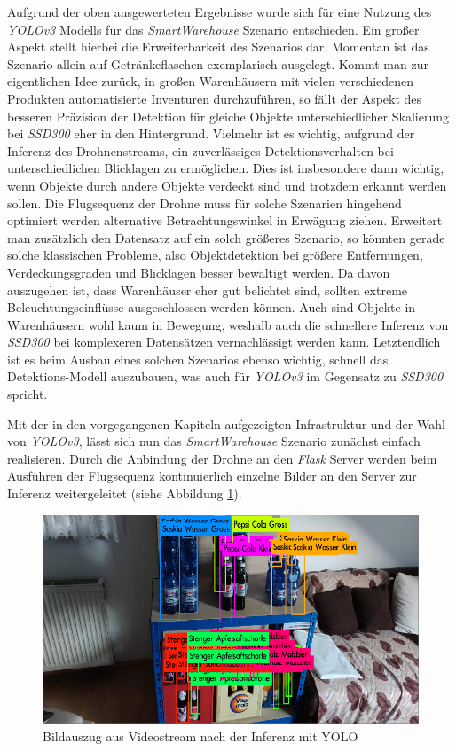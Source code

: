Aufgrund der oben ausgewerteten Ergebnisse wurde sich für eine Nutzung des \textit{YOLOv3} Modells für das \textit{SmartWarehouse} Szenario entschieden. Ein großer Aspekt stellt hierbei die Erweiterbarkeit des Szenarios dar. Momentan ist das Szenario allein auf Getränkeflaschen exemplarisch ausgelegt. Kommt man zur eigentlichen Idee zurück, in großen Warenhäusern mit vielen verschiedenen Produkten automatisierte Inventuren durchzuführen, so fällt der Aspekt des besseren Präzision der Detektion für gleiche Objekte unterschiedlicher Skalierung bei \textit{SSD300} eher in den Hintergrund. Vielmehr ist es wichtig, aufgrund der Inferenz des Drohnenstreams, ein zuverlässiges Detektionsverhalten bei unterschiedlichen Blicklagen zu ermöglichen. Dies ist insbesondere dann wichtig, wenn Objekte durch andere Objekte verdeckt sind und trotzdem erkannt werden sollen. Die Flugsequenz der Drohne muss für solche Szenarien hingehend optimiert werden alternative Betrachtungswinkel in Erwägung ziehen. Erweitert man zusätzlich den Datensatz auf ein solch größeres Szenario, so könnten gerade solche klassischen Probleme, also Objektdetektion bei größere Entfernungen, Verdeckungsgraden und Blicklagen besser bewältigt werden. Da davon auszugehen ist, dass Warenhäuser eher gut belichtet sind, sollten extreme Beleuchtungseinflüsse ausgeschlossen werden können. Auch sind Objekte in Warenhäusern wohl kaum in Bewegung, weshalb auch die schnellere Inferenz von \textit{SSD300} bei komplexeren Datensätzen vernachlässigt werden kann. Letztendlich ist es beim Ausbau eines solchen Szenarios ebenso wichtig, schnell das Detektions-Modell auszubauen, was auch für \textit{YOLOv3} im Gegensatz zu \textit{SSD300} spricht. 

Mit der in den vorgegangenen Kapiteln aufgezeigten Infrastruktur und der Wahl von \textit{YOLOv3}, lässt sich nun das \textit{SmartWarehouse} Szenario zunächst einfach realisieren. Durch die Anbindung der Drohne an den \textit{Flask} Server werden beim Ausführen der Flugsequenz kontinuierlich einzelne Bilder an den Server zur Inferenz weitergeleitet (siehe Abbildung \ref{yolo_inference}). 

\begin{figure}[H]
	\begin{center}
		\includegraphics[width=13cm]{Bilder/yolo_inference.png} 
		\caption{Bildauszug aus Videostream nach der Inferenz mit YOLO}
		\label{yolo_inference}
	\end{center}
\end{figure}

